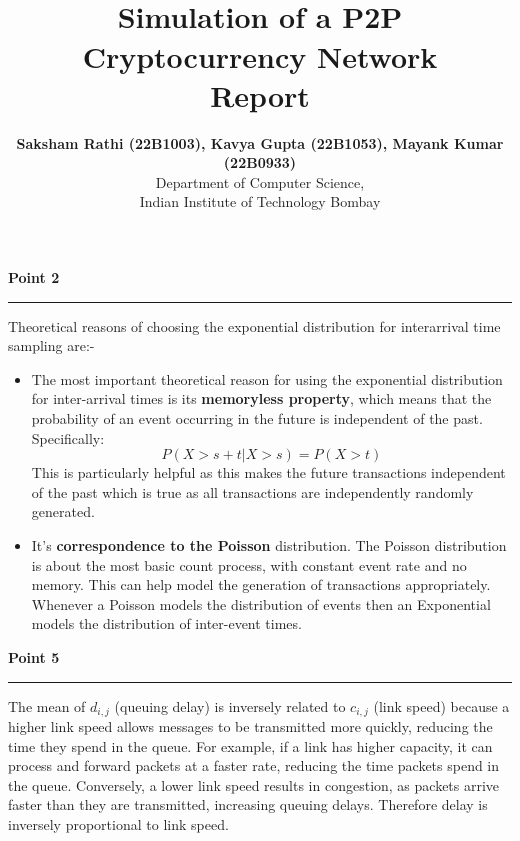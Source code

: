 \documentclass[a4paper,12pt]{article}
\title{\cooltitle{CS765 Project Part-1} \\
\LARGE \textbf{Simulation of a P2P Cryptocurrency Network} \\
Report}
\author{{\bf Saksham Rathi (22B1003), Kavya Gupta (22B1053), Mayank Kumar (22B0933)} \\
\small Department of Computer Science, \\
Indian Institute of Technology Bombay \\}
\date{}
\newenvironment{solution}[2][]{%
\begin{mdframed}[linecolor=blue!70!black, linewidth=2pt, roundcorner=10pt, backgroundcolor=yellow!10!white, skipabove=12pt, skipbelow=12pt]%
	\textbf{\large #2}
	\par\noindent\rule{\textwidth}{0.4pt}
}{
\end{mdframed}
}
\begin{document}
\maketitle


\begin{solution}{Point 2}
	Theoretical reasons of choosing the exponential distribution for
	interarrival time sampling are:-
	\begin{itemize}
		\item The most important theoretical reason for using the exponential distribution for inter-arrival times is its \textbf{memoryless property}, which means that the probability of an event occurring in the future is independent of the past. Specifically:
		\begin{equation*}
			P(X > s + t | X > s) = P(X > t)
		\end{equation*}
		This is particularly helpful as this makes the future transactions independent of the past which is true as all transactions are independently randomly generated.
		\item It's \textbf{correspondence to the Poisson} distribution. The Poisson distribution is about the most basic count process, with constant event rate and no memory. This can help model the generation of transactions appropriately. Whenever a Poisson models the distribution of events then an Exponential models the distribution of inter-event times.
	\end{itemize}
\end{solution}

\begin{solution}{Point 5}
	The mean of $d_{i,j}$ (queuing delay) is inversely related to $c_{i,j}$ (link speed) because a higher link speed allows messages to be transmitted more quickly, reducing the time they spend in the queue. For example, if a link has higher capacity, it can process and forward packets at a faster rate, reducing the time packets spend in the queue. Conversely, a lower link speed results in congestion, as packets arrive faster than they are transmitted, increasing queuing delays. Therefore delay is inversely proportional to link speed.
\end{solution}
\end{document}
